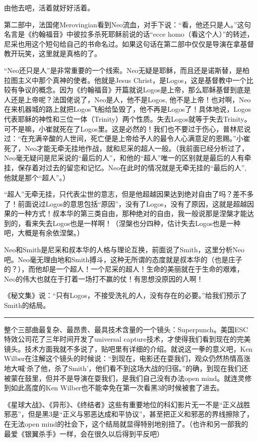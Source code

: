 \documentclass[UTF8]{ctexart}
\newcommand{\myparsep}{\noindent \rule[0.5ex]{\linewidth}{1pt}}
\begin{document}
由他去吧，活着就好好活着。

第二部中，法国佬Merovingian看到Neo流血，对手下说：“看，他还只是人。”这句名言是《约翰福音》中彼拉多杀死耶稣前说的话“ecce homo（看这个人）”的转述，尼采也用这个短句给自己的书命名过。如果这句话在第二部中仅仅是导演在拿基督教开玩笑，这里就是真格的了。

“Neo还只是人”是非常重要的一个线索。Neo无疑是耶稣，而且还是诺斯替，是柏拉图主义中那个真神的使者。他就是Jesus Christ，是Logos，这是基督教中一个比较有争议的概念。因为《约翰福音》开篇就说Logos是上帝，那么耶稣基督到底是人还是上帝呢？法国佬说了，Neo是人，他不是Logos, 他不是上帝！也对啊，Neo在来机器城的路上就把Logos飞船给坠毁了，他不再是Logos了！具体地说，Logos代表耶稣的神性和三位一体（Trinity）两个性质。失去Logos就等于失去Trinity。可不是嘛，小崔就死在了Logos里。这是必然的！我们也不要过于伤心，普林尼说过：“在充满辛酸的人世间，死亡便是上帝给予人的最令人心满意足的恩赐。”小崔死了，Neo才能无牵无挂地作战，就和尼采的超人一般。（我前面已经分析过了，Neo毫无疑问是尼采说的“最后的人”，和他的“超人”唯一的区别就是最后的人有牵挂，保存着对过去的留恋和记忆。Neo在此时的情况就是无牵无挂的“最后的人”, 他就是那个“超人”。）

“超人”无牵无挂，只代表尘世的意志，但是他超越因果达到绝对自由了吗？差不多了！前面说过Logos的意思包括“原因”，没有了Logos，没有了原因，这就是超越因果的一种方式！叔本华的第三类自由，那种绝对的自由，我一般说那是涅槃才能达到的，看来失去Logos也是一样啊！（涅槃也分四种，估计失去Logos也是一种吧，大概是有余依涅槃。）

Neo和Smith是尼采和叔本华的人格与理论互换，前面说了Smith，这里分析Neo吧。Neo毫无理由地和Smith搏斗，这种无所谓的态度就是叔本华的（也是庄子的？），而他却是一个超人！一个尼采的超人！生命的美丽就在于生命的艰难，Neo的伟大也就在于打着一场打不赢的仗！有思想没原因的人啊！

《秘文集》说：“只有Logos，不接受洗礼的人，没有存在的必要。”给我们预示了Smith的结局。

\myparsep

整个三部曲最复杂、最昂贵、最具技术含量的一个镜头：Superpunch。美国ESC特效公司花了三年时间开发了universal capture技术，才使得我们看到现在的完美镜头。技术方面我就不多说了，贴吧里有详细的介绍。就说这一拳的意义吧，Ken Wilber在注解这个镜头的时候说：“到现在，电影还在耍我们，观众仍然热情高涨地大喊‘杀了他，杀了Smith’，他们看不到这场大战的归宿。”的确，到现在我们还被蒙在鼓里，但并不是导演在耍我们，是我们自己没有办法open mind。就连灵修到如此高度的Ken Wilber也不能幸免在第一次看黑3的时候被套了进去。

《星球大战》、《异形》、《终结者》这些有重要地位的科幻影片无一不是“正义战胜邪恶”，但是黑3是“正义与邪恶达成和平协议”，甚至把正义和邪恶的界线擦除了，在无法open mind的社会下，这个结局就显得特别地别扭了。（也许和另一部我的最爱《银翼杀手》一样，会在很久以后得到平反吧）
\end{document}
